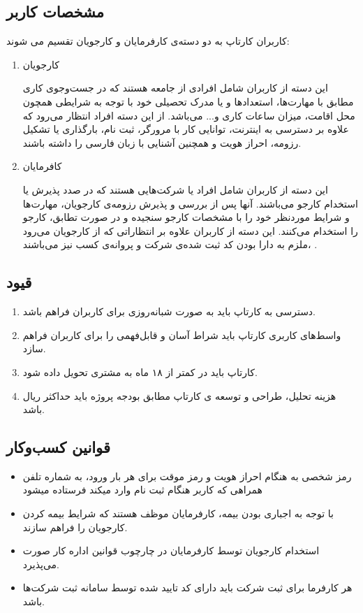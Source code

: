 \documentclass{report}
\begin{document}
			\subsection{مشخصات کاربر}
				کاربران کارتاپ به دو دسته‌ی کارفرمایان و کارجویان تقسیم می شوند:
				\begin{enumerate}
					\item 
					کارجویان
					
					این دسته از کاربران شامل افرادی از جامعه هستند که در جست‌وجوی کاری مطابق با مهارت‌ها، استعدادها و یا مدرک تحصیلی خود با توجه به شرایطی همچون محل اقامت، میزان ساعات کاری و... می‌باشد. از این دسته افراد انتظار می‌رود که علاوه بر دسترسی به اینترنت، توانایی کار با مرورگر، ثبت نام، بارگذاری یا تشکیل رزومه، احراز هویت و همچنین آشنایی با زبان فارسی را داشته باشند.
					\item
					 کافرمایان
					
					این دسته از کاربران شامل افراد یا شرکت‌هایی هستند که در صدد پذیرش یا استخدام کارجو می‌باشند. آنها پس از بررسی و پذیرش رزومه‌ی کارجویان، مهارت‌ها و شرایط موردنظر خود را با مشخصات کارجو سنجیده و در صورت تطابق، کارجو را استخدام می‌کنند. این دسته از کاربران علاوه بر انتظاراتی که از کارجویان می‌رود ،ملزم به دارا بودن کد ثبت شده‌ی شرکت و پروانه‌ی کسب نیز می‌باشند . 
				\end{enumerate}
				
			\subsection{قیود}
				\begin{enumerate}
					\item 
					دسترسی به کارتاپ باید به صورت شبانه‌روزی برای کاربران فراهم باشد.
					\item 
					واسط‌های کاربری کارتاپ باید شراط آسان و قابل‌فهمی را برای کاربران فراهم سازد.
					\item 
					کارتاپ باید در کمتر از ۱۸ ماه به مشتری تحویل داده شود.
					\item 
					 هزینه تحلیل، طراحی و توسعه ی کارتاپ مطابق بودجه پروژه باید حداکثر  ریال باشد.
				\end{enumerate}
			\subsection{قوانین کسب‌و‌کار}
				\begin{itemize}
					\item 
					رمز شخصی به هنگام احراز هویت و رمز موقت برای هر بار ورود، به شماره تلفن همراهی که کاربر هنگام ثبت نام وارد میکند فرستاده میشود
					\item 
					با توجه به اجباری بودن بیمه، کارفرمایان موظف هستند که شرایط بیمه کردن کارجویان را فراهم سازند.
					\item 
					استخدام کارجویان توسط کارفرمایان در چارچوب قوانین اداره کار صورت می‌پذیرد.
					\item
					هر کارفرما برای ثبت شرکت باید دارای کد تایید شده توسط سامانه ثبت شرکت‌ها باشد.
				\end{itemize}
\end{document}
